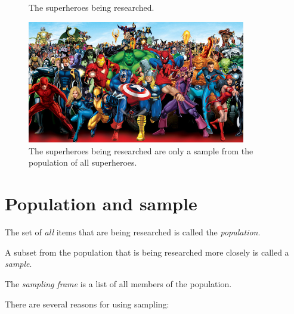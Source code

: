 \begin{figure}
  \caption{The superheroes being researched.}
  \label{fig:superheldenSteekproef}
\end{figure}

\begin{figure}
  \centering
  \includegraphics[width=0.85\textwidth]{images/les5-heroes.jpg}
  \caption{The superheroes being researched are only a sample from the population of all superheroes.}
  \label{fig:populatieHelden}
\end{figure}

\section{Population and sample}
\label{sec:population-and-sample}

\begin{definition}[Population]
  The set of \emph{all} items that are being researched is called the \emph{population}.
\end{definition}

\begin{definition}[Sample]
  A subset from the population that is being researched more closely is called a \emph{sample}.
\end{definition}

\begin{definition}
  The \emph{sampling frame} is a list of all members of the population.
\end{definition}

There are several reasons for using sampling:

